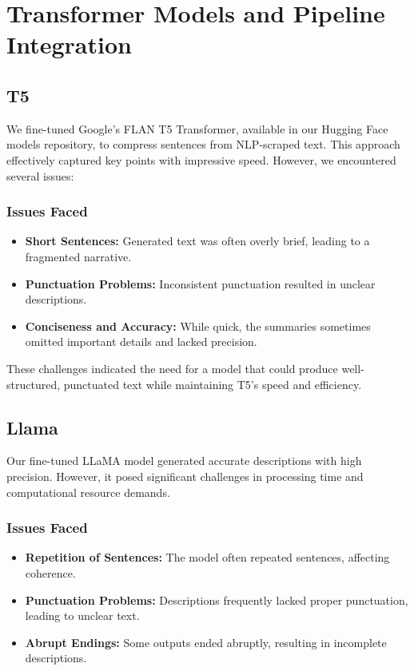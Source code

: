\documentclass[conference]{IEEEtran}
\begin{document}
   

    
\section{Transformer Models and Pipeline Integration}

    \subsection{T5}

We fine-tuned Google's FLAN T5 Transformer, available in our Hugging Face models repository, to compress sentences from NLP-scraped text. This approach effectively captured key points with impressive speed. However, we encountered several issues:

\subsubsection{Issues Faced}
\begin{itemize}
    \item \textbf{Short Sentences:} Generated text was often overly brief, leading to a fragmented narrative.
    \item \textbf{Punctuation Problems:} Inconsistent punctuation resulted in unclear descriptions.
    \item \textbf{Conciseness and Accuracy:} While quick, the summaries sometimes omitted important details and lacked precision.
\end{itemize}

These challenges indicated the need for a model that could produce well-structured, punctuated text while maintaining T5's speed and efficiency.

\subsection{Llama}

Our fine-tuned LLaMA model generated accurate descriptions with high precision. However, it posed significant challenges in processing time and computational resource demands.

\subsubsection{Issues Faced}
\begin{itemize}
    \item \textbf{Repetition of Sentences:} The model often repeated sentences, affecting coherence.
    \item \textbf{Punctuation Problems:} Descriptions frequently lacked proper punctuation, leading to unclear text.
    \item \textbf{Abrupt Endings:} Some outputs ended abruptly, resulting in incomplete descriptions.
\end{itemize}
\end{document}

